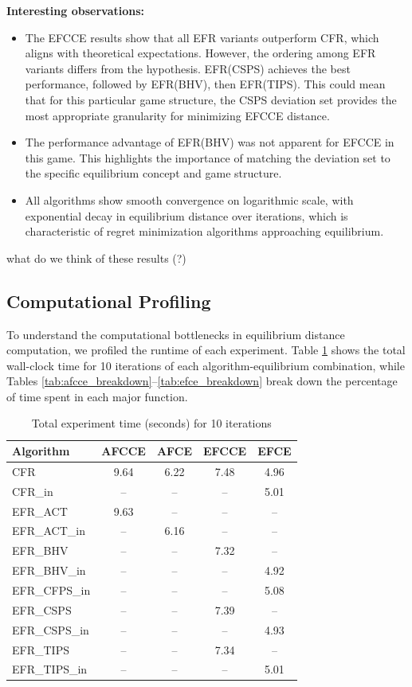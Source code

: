 \documentclass[11pt]{article}
\begin{document}
\textbf{Interesting observations:}
\begin{itemize}
    \item The EFCCE results show that all EFR variants outperform CFR, which aligns with theoretical expectations. However, the ordering among EFR variants differs from the hypothesis. EFR(CSPS) achieves the best performance, followed by EFR(BHV), then EFR(TIPS). This could mean that for this particular game structure, the CSPS deviation set provides the most appropriate granularity for minimizing EFCCE distance.

    \item The performance advantage of EFR(BHV) was not apparent for EFCCE in this game. This highlights the importance of matching the deviation set to the specific equilibrium concept and game structure.

    \item All algorithms show smooth convergence on logarithmic scale, with exponential decay in equilibrium distance over iterations, which is characteristic of regret minimization algorithms approaching equilibrium.
\end{itemize}

what do we think of these results (?)

\subsection{Computational Profiling}

To understand the computational bottlenecks in equilibrium distance computation, we profiled the runtime of each experiment. Table \ref{tab:total_time} shows the total wall-clock time for 10 iterations of each algorithm-equilibrium combination, while Tables \ref{tab:afcce_breakdown}--\ref{tab:efce_breakdown} break down the percentage of time spent in each major function.

\begin{table}[H]
\centering
\caption{Total experiment time (seconds) for 10 iterations}
\label{tab:total_time}
\begin{tabular}{lcccc}
\toprule
Algorithm & AFCCE & AFCE & EFCCE & EFCE \\
\midrule
CFR & 9.64 & 6.22 & 7.48 & 4.96 \\
CFR\_in & -- & -- & -- & 5.01 \\
EFR\_ACT & 9.63 & -- & -- & -- \\
EFR\_ACT\_in & -- & 6.16 & -- & -- \\
EFR\_BHV & -- & -- & 7.32 & -- \\
EFR\_BHV\_in & -- & -- & -- & 4.92 \\
EFR\_CFPS\_in & -- & -- & -- & 5.08 \\
EFR\_CSPS & -- & -- & 7.39 & -- \\
EFR\_CSPS\_in & -- & -- & -- & 4.93 \\
EFR\_TIPS & -- & -- & 7.34 & -- \\
EFR\_TIPS\_in & -- & -- & -- & 5.01 \\
\bottomrule
\end{tabular}
\end{table}
\end{document}
